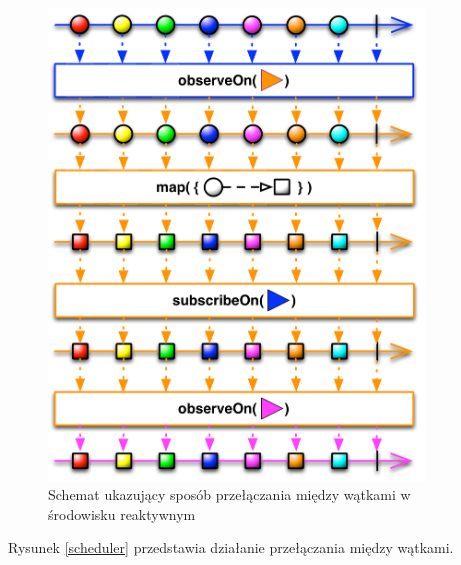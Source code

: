 \documentclass[12pt,oneside,a4paper]{report}
\begin{document}
\begin{figure}[ht!]
	\centering
	\includegraphics[width=10cm]{schedulers}
	\caption{Schemat ukazujący sposób przełączania między wątkami w środowisku reaktywnym\cite{scheduler}}
	\label{schedulers}
\end{figure}
Rysunek \ref{scheduler} przedstawia działanie przełączania między wątkami.
\pagebreak
\end{document}
